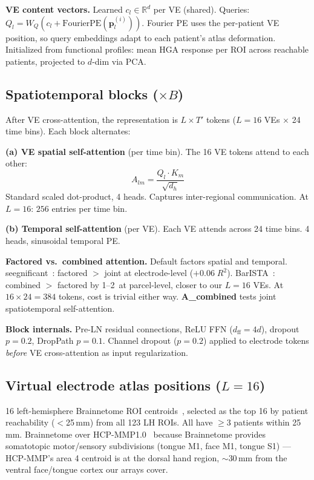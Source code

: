\documentclass[11pt,letterpaper]{article}
\newcommand{\bfp}{\mathbf{p}}
\newcommand{\R}{\mathbb{R}}
\newcommand{\pp}{\,\text{pp}}
\begin{document}
\textbf{VE content vectors.} Learned $c_l \in \R^d$ per VE (shared). Queries: $Q_l = W_Q(c_l + \text{FourierPE}(\bfp_l^{(i)}))$. Fourier PE uses the per-patient VE position, so query embeddings adapt to each patient's atlas deformation. Initialized from functional profiles: mean HGA response per ROI across reachable patients, projected to $d$-dim via PCA.


\subsection{Spatiotemporal blocks ($\times B$)}\label{sec:blocks}

After VE cross-attention, the representation is $L \times T'$ tokens ($L{=}16$ VEs $\times$ 24 time bins). Each block alternates:

\textbf{(a) VE spatial self-attention} (per time bin). The 16 VE tokens attend to each other:
\begin{equation}
A_{lm} = \frac{Q_l \cdot K_m}{\sqrt{d_h}}
\end{equation}
Standard scaled dot-product, 4 heads. Captures inter-regional communication. At $L{=}16$: $256$ entries per time bin.

\textbf{(b) Temporal self-attention} (per VE). Each VE attends across 24 time bins. 4 heads, sinusoidal temporal PE.

\textbf{Factored vs.\ combined attention.} Default factors spatial and temporal. seegnificant~\cite{mentzelopoulos2024}: factored $>$ joint at electrode-level ($+0.06\; R^2$). BarISTA~\cite{oganesian2025}: combined $>$ factored by 1--2\pp{} at parcel-level, closer to our $L{=}16$ VEs. At $16 \times 24 = 384$ tokens, cost is trivial either way. \textbf{A\_combined} tests joint spatiotemporal self-attention.

\textbf{Block internals.} Pre-LN residual connections, ReLU FFN ($d_\text{ff} = 4d$), dropout $p{=}0.2$, DropPath $p{=}0.1$. Channel dropout ($p{=}0.2$) applied to electrode tokens \textit{before} VE cross-attention as input regularization.


\subsection{Virtual electrode atlas positions ($L{=}16$)}\label{sec:ve-atlas}

16 left-hemisphere Brainnetome ROI centroids~\cite{fan2016}, selected as the top 16 by patient reachability ($<$25\,mm) from all 123 LH ROIs. All have ${\geq}3$ patients within 25\,mm. Brainnetome over HCP-MMP1.0~\cite{glasser2016} because Brainnetome provides somatotopic motor/sensory subdivisions (tongue M1, face M1, tongue S1) --- HCP-MMP's area 4 centroid is at the dorsal hand region, ${\sim}$30\,mm from the ventral face/tongue cortex our arrays cover.
\end{document}
